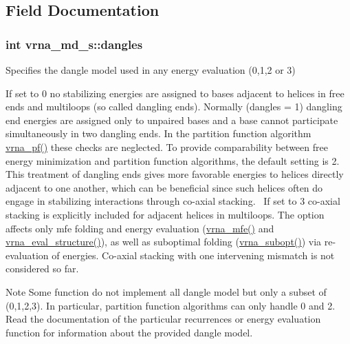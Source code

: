 \subsection{Field Documentation}
\subsubsection[{\texorpdfstring{dangles}{dangles}}]{\setlength{\rightskip}{0pt plus 5cm}int vrna\+\_\+md\+\_\+s\+::dangles}\hypertarget{structvrna__md__s_adcda4ff2ea77748ae0e8700288282efc}{}\label{structvrna__md__s_adcda4ff2ea77748ae0e8700288282efc}


Specifies the dangle model used in any energy evaluation (0,1,2 or 3) 

If set to 0 no stabilizing energies are assigned to bases adjacent to helices in free ends and multiloops (so called dangling ends). Normally (dangles = 1) dangling end energies are assigned only to unpaired bases and a base cannot participate simultaneously in two dangling ends. In the partition function algorithm \hyperlink{group__pf__fold_ga29e256d688ad221b78d37f427e0e99bc}{vrna\+\_\+pf()} these checks are neglected. To provide comparability between free energy minimization and partition function algorithms, the default setting is 2. This treatment of dangling ends gives more favorable energies to helices directly adjacent to one another, which can be beneficial since such helices often do engage in stabilizing interactions through co-\/axial stacking.~\newline
If set to 3 co-\/axial stacking is explicitly included for adjacent helices in multiloops. The option affects only mfe folding and energy evaluation (\hyperlink{group__mfe__fold_gabd3b147371ccf25c577f88bbbaf159fd}{vrna\+\_\+mfe()} and \hyperlink{group__eval_ga58f199f1438d794a265f3b27fc8ea631}{vrna\+\_\+eval\+\_\+structure()}), as well as suboptimal folding (\hyperlink{group__subopt__wuchty_ga0f11d738fb8c8b1885a90c11c8931ff6}{vrna\+\_\+subopt()}) via re-\/evaluation of energies. Co-\/axial stacking with one intervening mismatch is not considered so far. \begin{DoxyNote}{Note}
Some function do not implement all dangle model but only a subset of (0,1,2,3). In particular, partition function algorithms can only handle 0 and 2. Read the documentation of the particular recurrences or energy evaluation function for information about the provided dangle model. 
\end{DoxyNote}
